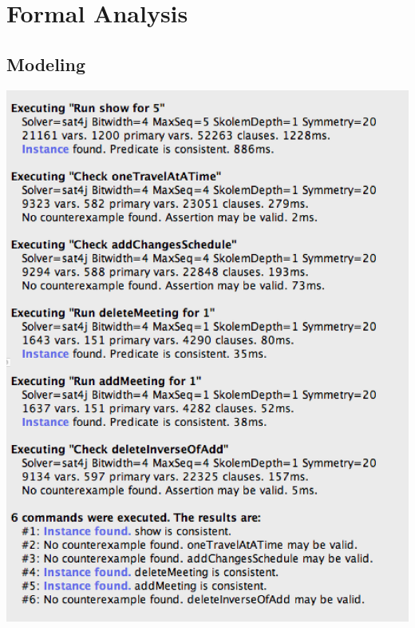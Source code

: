 %
%
\chapter{Formal Analysis}
%
\label{cap:formalanalysis}
%
%
\section{Modeling}

%
%
\begin{center}
\vspace{10mm}
\includegraphics[scale=0.8]{MainMatter/images/alloy/results}
\end{center}
